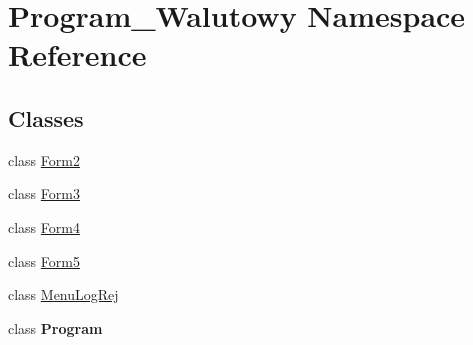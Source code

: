 \hypertarget{namespace_program___walutowy}{}\section{Program\+\_\+\+Walutowy Namespace Reference}
\label{namespace_program___walutowy}
\subsection*{Classes}
\begin{DoxyCompactItemize}
\item 
class \mbox{\hyperlink{class_program___walutowy_1_1_form2}{Form2}}
\item 
class \mbox{\hyperlink{class_program___walutowy_1_1_form3}{Form3}}
\item 
class \mbox{\hyperlink{class_program___walutowy_1_1_form4}{Form4}}
\item 
class \mbox{\hyperlink{class_program___walutowy_1_1_form5}{Form5}}
\item 
class \mbox{\hyperlink{class_program___walutowy_1_1_menu_log_rej}{Menu\+Log\+Rej}}
\item 
class {\bfseries Program}
\end{DoxyCompactItemize}
